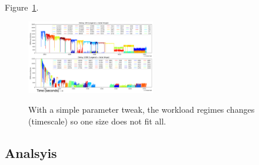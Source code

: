 Figure~\ref{fig:scale-delay}.
\begin{figure}[tbh]
  \noindent\includegraphics[width=0.5\textwidth]{figures/scale-delay.png}\\
  \caption{With a simple parameter tweak, the workload regimes changes
  (timescale) so one size does not fit all.  \label{fig:scale-delay}}
\end{figure}



\subsection{Analsyis}

\pagebreak
